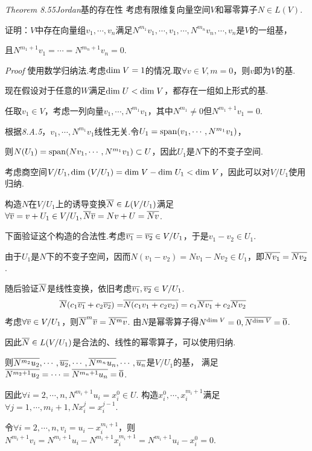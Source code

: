 \textit{Theorem 8.55}\textit{Jordan}{\kaishu 基的存在性}
考虑有限维复向量空间\(V\)和幂零算子\(N \in L(V)\).

证明：\(V\)中存在向量组\(v_1,\cdots,v_n\)满足\(N^{m_1}v_1,\cdots,v_1,\cdots,N^{m_n}v_n,\cdots,v_n\)是\(V\)的一组基，

且\(N^{m_1+1}v_1=\cdots=N^{m_n+1}v_n=0\).

\textit{Proof}
使用数学归纳法.考虑\(\mathrm{dim \;} V=1\)的情况.取\(\forall v \in V,m=0\)，则\(v\)即为\(V\)的基.

现在假设对于任意的\(W\)满足\(\mathrm{dim \;} U<\mathrm{dim \;} V\)，都存在一组如上形式的基.

任取\(v_1 \in V\)，考虑一列向量\(v_1,\cdots,N^{m_1}v_1\)，其中\(N^{m_1} \ne 0\)但\(N^{m_1+1}v_1=0\).

根据\textit{8.A.5}，\(v_1,\cdots,N^{m_1}v_1\)线性无关.令\(U_1=\mathrm{span} (v_1,\cdots,N^{m_1}v_1)\)，

则\(N(U_1)=\mathrm{span} (Nv_1,\cdots,N^{m_1}v_1) \subset U\)，因此\(U_1\)是\(N\)下的不变子空间.

考虑商空间\(V/U_1,\mathrm{dim \;} (V/U_1)=\mathrm{dim \;} V-\mathrm{dim \;} U_1<\mathrm{dim \;} V\)，因此可以对\(V/U_1\)使用归纳.

构造\(N\)在\(V/U_1\)上的诱导变换\(\overline{N} \in L(V/U_1)\)满足\(\forall \overline{v}=v+U_1 \in V/U_1,\overline{N}\overline{v}=Nv+U=\overline{Nv}\).

下面验证这个构造的合法性.考虑\(\overline{v_1}=\overline{v_2} \in V/U_1\)，于是\(v_1-v_2 \in U_1\).

由于\(U_1\)是\(N\)下的不变子空间，因而\(N(v_1-v_2)=Nv_1-Nv_2 \in U_1\)，即\(\overline{Nv_1}=\overline{Nv_2}\).

随后验证\(\overline{N}\)是线性变换，依旧考虑\(\overline{v_1},\overline{v_2} \in V/U_1\).
    \begin{align*}
        \overline{N}(c_1\overline{v_1}+c_2\overline{v_2})=&\overline{N(c_1v_1+c_2v_2)} =c_1\overline{Nv_1}+c_2\overline{Nv_2}
    \end{align*}
考虑\(\forall \overline{v} \in V/U_1\)，则\(\overline{N}^m \overline{v}=\overline{N^m v}\).
由\(N\)是幂零算子得\(N^{\mathrm{dim \;} V}=0,\overline{N^{\mathrm{dim \;} V}}=\overline{0}\).

因此\(\overline{N} \in L(V/U_1)\)是合法的、线性的幂零算子，可以使用归纳.

则\(\overline{N^{m_2}u_2},\cdots,\overline{u_2},\cdots,\overline{N^{m_n}u_n},\cdots,\overline{u_n}\)是\(V/U_1\)的基，
满足\(\overline{N^{m_2+1}u_2}=\cdots=\overline{N^{m_n+1}u_n}=\overline{0}\).

因此\(\forall i=2,\cdots,n,N^{m_i+1}u_i=x_i^0 \in U\).
构造\(x_i^0,\cdots,x_i^{m_i+1}\)满足\(\forall j=1,\cdots,m_i+1,Nx_i^j=x_i^{j-1}\).

令\(\forall i=2,\cdots,n,v_i=u_i-x_i^{m_i+1}\)，则\(N^{m_i+1}v_i=N^{m_i+1}u_i-N^{m_i+1}x_i^{m_i+1}=N^{m_i+1}u_i-x_i^0=0\).

